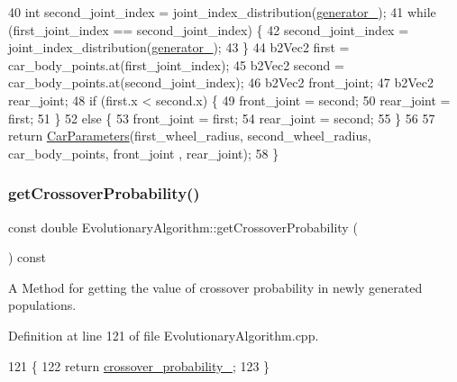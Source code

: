 \begin{DoxyCode}
40     \textcolor{keywordtype}{int} second\_joint\_index = joint\_index\_distribution(\hyperlink{classEvolutionaryAlgorithm_adbd823d385ad95bf20496fd2fc25ccde}{generator\_});
41     \textcolor{keywordflow}{while} (first\_joint\_index == second\_joint\_index) \{
42         second\_joint\_index = joint\_index\_distribution(\hyperlink{classEvolutionaryAlgorithm_adbd823d385ad95bf20496fd2fc25ccde}{generator\_});
43     \}
44     b2Vec2 first = car\_body\_points.at(first\_joint\_index);
45     b2Vec2 second = car\_body\_points.at(second\_joint\_index);
46     b2Vec2 front\_joint;
47     b2Vec2 rear\_joint;
48     \textcolor{keywordflow}{if} (first.x < second.x) \{
49         front\_joint = second;
50         rear\_joint = first;
51     \}
52     \textcolor{keywordflow}{else} \{
53         front\_joint = first;
54         rear\_joint = second;
55     \}
56 
57     \textcolor{keywordflow}{return} \hyperlink{classCarParameters}{CarParameters}(first\_wheel\_radius, second\_wheel\_radius, car\_body\_points, front\_joint
      , rear\_joint);
58 \}
\end{DoxyCode}
\mbox{\label{classEvolutionaryAlgorithm_a71ca76fa04d0824bf7cf86b67fc65414}} 
\subsubsection{\texorpdfstring{get\+Crossover\+Probability()}{getCrossoverProbability()}}
{\footnotesize\ttfamily const double Evolutionary\+Algorithm\+::get\+Crossover\+Probability (\begin{DoxyParamCaption}{ }\end{DoxyParamCaption}) const}



A Method for getting the value of crossover probability in newly generated populations. 



Definition at line 121 of file Evolutionary\+Algorithm.\+cpp.


\begin{DoxyCode}
121                                                                   \{
122     \textcolor{keywordflow}{return} \hyperlink{classEvolutionaryAlgorithm_a815be8b2644e2d1bdc6378c88ab03da3}{crossover\_probability\_};
123 \}
\end{DoxyCode}
\mbox{\label{classEvolutionaryAlgorithm_a306ea15ca9a4eb67b84d22c7b24ef659}} 
